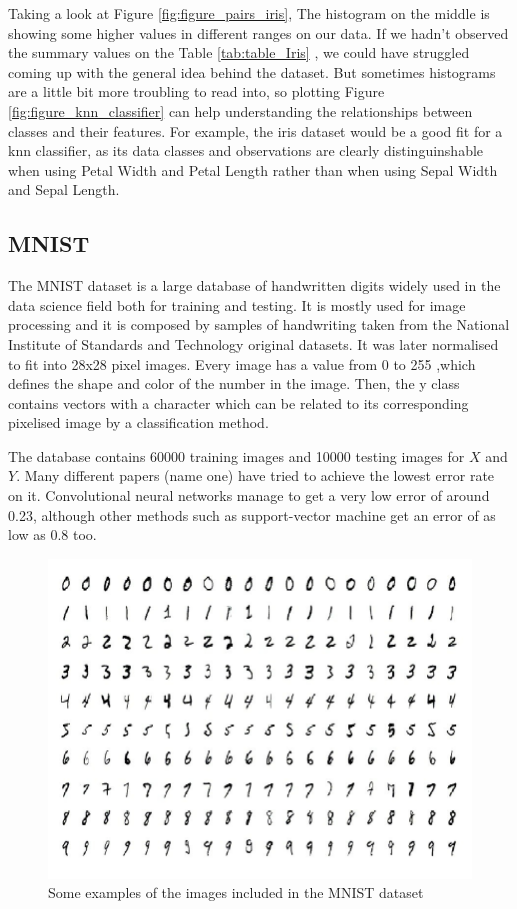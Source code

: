Taking a look at Figure \ref{fig:figure_pairs_iris}, The histogram on the middle is showing some higher values in different ranges on our data. If we hadn't observed the summary values on the Table \ref{tab:table_Iris} , we could have struggled coming up with the general idea behind the dataset. But sometimes histograms are a little bit more troubling to read into, so plotting Figure \ref{fig:figure_knn_classifier} can help understanding the relationships between classes and their features. For example, the iris dataset would be a good fit for a knn classifier, as its data classes and observations are clearly distinguinshable when using Petal Width and Petal Length rather than when using Sepal Width and Sepal Length. \par

\subsection{MNIST}

The MNIST dataset is a large database of handwritten digits widely used in the data science field both for training and testing. It is mostly used for image processing and it is composed by samples of handwriting taken from the National Institute of Standards and Technology original datasets. It was later normalised to fit into 28x28 pixel images. Every image has a value from 0 to 255 ,which defines the shape and color of the number in the image. Then, the y class contains vectors with a character which can be related to its corresponding pixelised image by a classification method. \par

The database contains 60000 training images and 10000 testing images for $X$ and $Y$. Many different papers (name one) have tried to achieve the lowest error rate on it. Convolutional neural networks manage to get a very low error of around 0.23, although other methods such as support-vector machine get an error of as low as 0.8 too.\par

\begin{figure}[H]
\centering
  \includegraphics[width=16cm]{Figuras_tfg/Figure_MNIST}
  \caption{Some examples of the images included in the MNIST dataset}
 \label{fig:figure_MNIST}
\end{figure}

